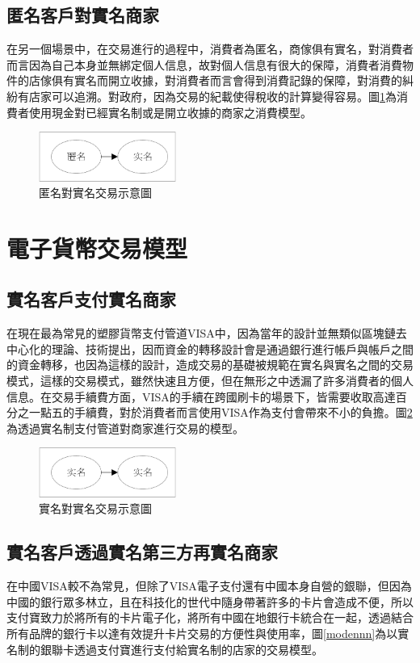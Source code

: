 		\subsection{匿名客戶對實名商家}
		在另一個場景中，在交易進行的過程中，消費者為匿名，商傢俱有實名，對消費者而言因為自己本身並無綁定個人信息，故對個人信息有很大的保障，消費者消費物件的店傢俱有實名而開立收據，對消費者而言會得到消費記錄的保障，對消費的糾紛有店家可以追溯。對政府，因為交易的紀載使得稅收的計算變得容易。圖\ref{modean}為消費者使用現金對已經實名制或是開立收據的商家之消費模型。

		\begin{figure}[h]
			\centering
			\includegraphics[width = 0.4\textwidth]{modean.png}
			\caption{匿名對實名交易示意圖}\label{modean}
		\end{figure}

	\section{電子貨幣交易模型}

		\subsection{實名客戶支付實名商家}
		在現在最為常見的塑膠貨幣支付管道VISA中，因為當年的設計並無類似區塊鏈去中心化的理論、技術提出，因而資金的轉移設計會是通過銀行進行帳戶與帳戶之間的資金轉移，也因為這樣的設計，造成交易的基礎被規範在實名與實名之間的交易模式，這樣的交易模式，雖然快速且方便，但在無形之中透漏了許多消費者的個人信息。在交易手續費方面，VISA的手續在跨國刷卡的場景下，皆需要收取高達百分之一點五的手續費，對於消費者而言使用VISA作為支付會帶來不小的負擔。圖\ref{modenn}為透過實名制支付管道對商家進行交易的模型。

		\begin{figure}[h]
			\centering
			\includegraphics[width = 0.4\textwidth]{modenn.png}
			\caption{實名對實名交易示意圖}\label{modenn}
		\end{figure}

		\subsection{實名客戶透過實名第三方再實名商家}
		在中國VISA較不為常見，但除了VISA電子支付還有中國本身自營的銀聯，但因為中國的銀行眾多林立，且在科技化的世代中隨身帶著許多的卡片會造成不便，所以支付寶致力於將所有的卡片電子化，將所有中國在地銀行卡統合在一起，透過結合所有品牌的銀行卡以達有效提升卡片交易的方便性與使用率，圖\ref{modennn}為以實名制的銀聯卡透過支付寶進行支付給實名制的店家的交易模型。

